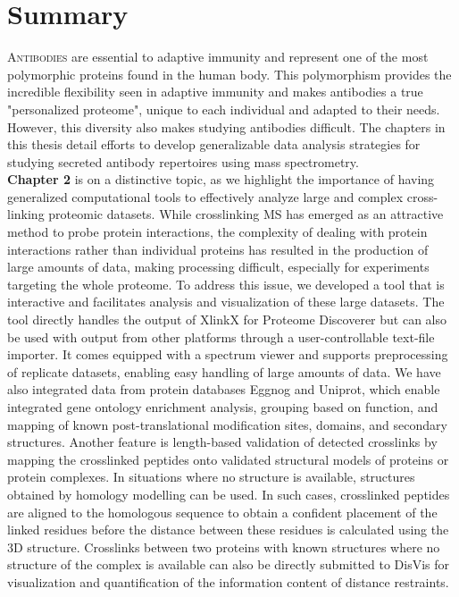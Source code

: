 \section{Summary}
\lettrine[lraise=0.1, nindent=0em, slope=-.5em]{A}{ntibodies} are essential to adaptive immunity and represent one of the most polymorphic proteins found in the human body. This polymorphism provides the incredible flexibility seen in adaptive immunity and makes antibodies a true "personalized proteome", unique to each individual and adapted to their needs. However, this diversity also makes studying antibodies difficult. The chapters in this thesis detail efforts to develop generalizable data analysis strategies for studying secreted antibody repertoires using mass spectrometry.
\bigskip\\
\textbf{Chapter 2} is on a distinctive topic, as we highlight the importance of having generalized computational tools to effectively analyze large and complex cross-linking proteomic datasets. While crosslinking MS has emerged as an attractive method to probe protein interactions, the complexity of dealing with protein interactions rather than individual proteins has resulted in the production of large amounts of data, making processing difficult, especially for experiments targeting the whole proteome. To address this issue, we developed a tool that is interactive and facilitates analysis and visualization of these large datasets. The tool directly handles the output of XlinkX for Proteome Discoverer but can also be used with output from other platforms through a user-controllable text-file importer. It comes equipped with a spectrum viewer and supports preprocessing of replicate datasets, enabling easy handling of large amounts of data. We have also integrated data from protein databases Eggnog and Uniprot, which enable integrated gene ontology enrichment analysis, grouping based on function, and mapping of known post-translational modification sites, domains, and secondary structures. Another feature is length-based validation of detected crosslinks by mapping the crosslinked peptides onto validated structural models of proteins or protein complexes. In situations where no structure is available, structures obtained by homology modelling can be used. In such cases, crosslinked peptides are aligned to the homologous sequence to obtain a confident placement of the linked residues before the distance between these residues is calculated using the 3D structure. Crosslinks between two proteins with known structures where no structure of the complex is available can also be directly submitted to DisVis for visualization and quantification of the information content of distance restraints.
